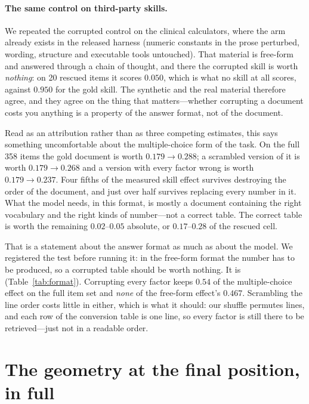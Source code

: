 \documentclass{article}
\begin{document}
\paragraph{The same control on third-party skills.} We repeated the corrupted
control on the clinical calculators, where the arm already exists in the
released harness (numeric constants in the prose perturbed, wording, structure
and executable tools untouched). That material is free-form and answered through
a chain of thought, and there the corrupted skill is worth \emph{nothing}: on 20
rescued items it scores $0.050$, which is what no skill at all scores, against
$0.950$ for the gold skill. The synthetic and the real material therefore agree,
and they agree on the thing that matters---whether corrupting a document costs
you anything is a property of the answer format, not of the document.

Read as an attribution rather than as three competing estimates, this says
something uncomfortable about the multiple-choice form of the task. On the full
358 items the gold document is worth $0.179 \to 0.288$; a scrambled version of
it is worth $0.179 \to 0.268$ and a version with every factor wrong is worth
$0.179 \to 0.237$. Four fifths of the measured skill effect survives destroying
the order of the document, and just over half survives replacing every number
in it. What the model needs, in this format, is mostly a document containing the
right vocabulary and the right kinds of number---not a correct table. The
correct table is worth the remaining $0.02$--$0.05$ absolute, or $0.17$--$0.28$
of the rescued cell.

That is a statement about the answer format as much as about the model. We
registered the test before running it: in the free-form format the number has to
be produced, so a corrupted table should be worth nothing. It is
(Table~\ref{tab:format}). Corrupting every factor keeps $0.54$ of the
multiple-choice effect on the full item set and \emph{none} of the free-form
effect's $0.467$. Scrambling the line order costs little in either, which is what it
should: our shuffle permutes lines, and each row of the conversion table is one
line, so every factor is still there to be retrieved---just not in a readable
order.


\section{The geometry at the final position, in full}
\label{app:geometry}
\end{document}

